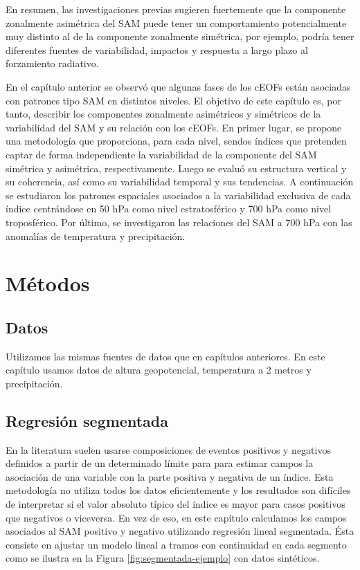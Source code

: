 \documentclass[12pt,oneside,a4paper]{reedthesis}
\begin{document}
En resumen, las investigaciones previas sugieren fuertemente que la componente zonalmente asimétrica del SAM puede tener un comportamiento potencialmente muy distinto al de la componente zonalmente simétrica, por ejemplo, podría tener diferentes fuentes de variabilidad, impactos y respuesta a largo plazo al forzamiento radiativo.

En el capítulo anterior se observó que algunas fases de los cEOFs están asociadas con patrones tipo SAM en distintos niveles.
El objetivo de este capítulo es, por tanto, describir los componentes zonalmente asimétricos y simétricos de la variabilidad del SAM y su relación con los cEOFs.
En primer lugar, se propone una metodología que proporciona, para cada nivel, sendos índices que pretenden captar de forma independiente la variabilidad de la componente del SAM simétrica y asimétrica, respectivamente.
Luego se evaluó su estructura vertical y su coherencia, así como su variabilidad temporal y sus tendencias.
A continuación se estudiaron los patrones espaciales asociados a la variabilidad exclusiva de cada índice centrándose en 50 hPa como nivel estratosférico y 700 hPa como nivel troposférico.
Por último, se investigaron las relaciones del SAM a 700 hPa con las anomalías de temperatura y precipitación.

\hypertarget{muxe9todos-3}{%
\section{Métodos}\label{muxe9todos-3}}

\hypertarget{datos-3}{%
\subsection{Datos}\label{datos-3}}

Utilizamos las mismas fuentes de datos que en capítulos anteriores.
En este capítulo usamos datos de altura geopotencial, temperatura a 2 metros y precipitación.

\hypertarget{regresiuxf3n-segmentada}{%
\subsection{Regresión segmentada}\label{regresiuxf3n-segmentada}}

En la literatura suelen usarse composiciones de eventos positivos y negativos definidos a partir de un determinado límite para para estimar campos la asociación de una variable con la parte positiva y negativa de un índice.
Esta metodología no utiliza todos los datos eficientemente y los resultados son difíciles de interpretar si el valor absoluto típico del índice es mayor para casos positivos que negativos o viceversa.
En vez de eso, en este capítulo calculamos los campos asociados al SAM positivo y negativo utilizando regresión lineal segmentada.
Ésta consiste en ajustar un modelo lineal a tramos con continuidad en cada segmento como se ilustra en la Figura \ref{fig:segmentada-ejemplo} con datos sintéticos.
\end{document}
